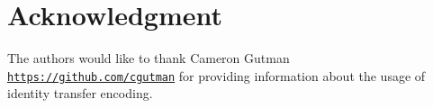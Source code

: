 \documentclass[journal,10pt]{IEEEtran}
\begin{document}
\twocolumn

\section*{Acknowledgment}


The authors would like to thank Cameron Gutman \texttt{\url{https://github.com/cgutman}} for providing information about the usage of identity transfer encoding.


\ifCLASSOPTIONcaptionsoff
  \newpage
\fi




\nocite{*}



\end{document}
